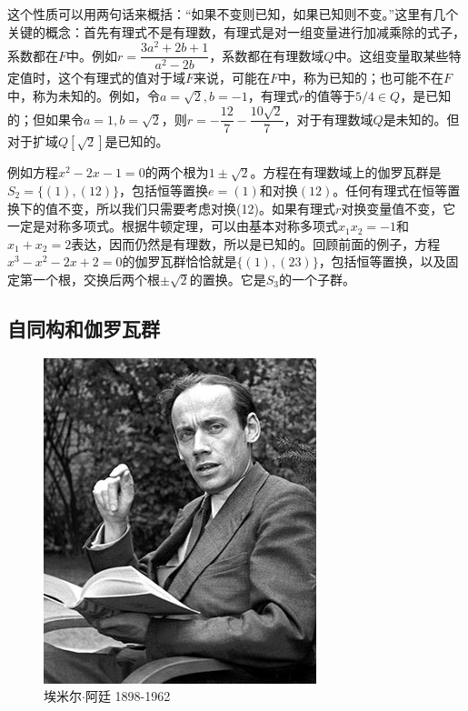 \documentclass[b5paper]{ctexart}
\begin{document}
这个性质可以用两句话来概括：“如果不变则已知，如果已知则不变。”这里有几个关键的概念：首先有理式不是有理数，有理式是对一组变量进行加减乘除的式子，系数都在$F$中。例如$r = \dfrac{3a^2 + 2b + 1}{a^2 - 2b}$，系数都在有理数域$Q$中。这组变量取某些特定值时，这个有理式的值对于域$F$来说，可能在$F$中，称为已知的；也可能不在$F$中，称为未知的。例如，令$a = \sqrt{2}, b = -1$，有理式$r$的值等于$5/4 \in Q$，是已知的；但如果令$a = 1, b = \sqrt{2}$，则$r = -\dfrac{12}{7} - \dfrac{10\sqrt{2}}{7}$，对于有理数域$Q$是未知的。但对于扩域$Q[\sqrt{2}]$是已知的。

例如方程$x^2 - 2x - 1 = 0$的两个根为$1 \pm \sqrt{2}$。方程在有理数域上的伽罗瓦群是$S_2 = \{(1), (12)\}$，包括恒等置换$e = (1)$和对换$(12)$。任何有理式在恒等置换下的值不变，所以我们只需要考虑对换(12)。如果有理式$r$对换变量值不变，它一定是对称多项式。根据牛顿定理，可以由基本对称多项式$x_1x_2 = -1$和$x_1 + x_2 = 2$表达，因而仍然是有理数，所以是已知的。回顾前面的例子，方程$x^3 - x^2 - 2x + 2 = 0$的伽罗瓦群恰恰就是$\{(1), (23)\}$，包括恒等置换，以及固定第一个根，交换后两个根$\pm \sqrt{2}$的置换。它是$S_3$的一个子群。

\begin{Exercise}
\end{Exercise}

\subsection{自同构和伽罗瓦群}

\begin{figure}[htbp]
 \centering
 \includegraphics[scale=0.4]{img/emil-artin}
 \captionsetup{labelformat=empty}
 \caption{埃米尔$\cdot$阿廷 1898-1962}
 \label{fig:Emil-Artin}
\end{figure}
\end{document}
